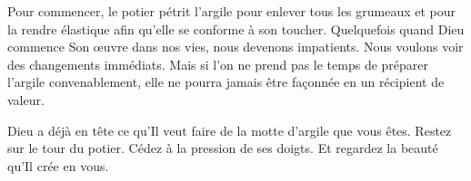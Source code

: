 
Pour commencer, le potier pétrit l'argile pour enlever tous les grumeaux
 et pour la rendre élastique afin qu'elle se conforme à son toucher.
 Quelquefois quand Dieu commence Son œuvre dans nos vies,
 nous devenons impatients. Nous voulons voir des changements immédiats.
 Mais si l'on ne prend pas le temps de préparer l'argile convenablement,
 elle ne pourra jamais être façonnée en un récipient de valeur. 

Dieu a déjà en tête ce qu'Il veut faire de la motte d'argile que vous êtes.
 Restez sur le tour du potier. Cédez à la pression de ses doigts.
 Et regardez la beauté qu'Il crée en vous. 

\dvrule




